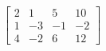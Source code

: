 %
\begin{align*}
\begin{bmatrix}
2 & 1 & 5 & 10\\ 
1 & -3 & -1 & -2\\ 
4 & -2 & 6 & 12
\end{bmatrix}
\end{align*}
%